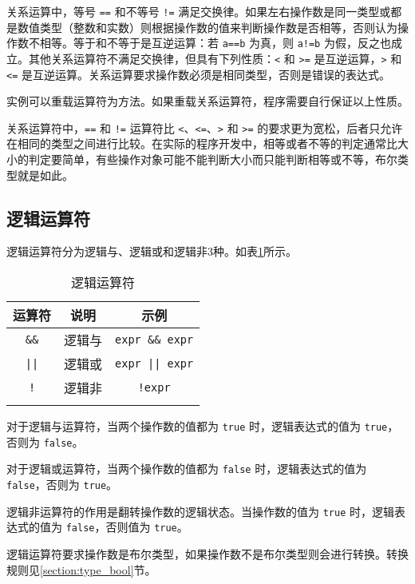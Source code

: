 关系运算中，等号 \texttt{==} 和不等号 \texttt{!=} 满足交换律。如果左右操作数是同一类型或都是数值类型（整数和实数）则根据操作数的值来判断操作数是否相等，否则认为操作数不相等。等于和不等于是互逆运算：若 \texttt{a==b} 为真，则 \texttt{a!=b} 为假，反之也成立。其他关系运算符不满足交换律，但具有下列性质：\texttt{<} 和 \texttt{>=} 是互逆运算，\texttt{>} 和 \texttt{<=} 是互逆运算。关系运算要求操作数必须是相同类型，否则是错误的表达式。

实例可以重载运算符为方法。如果重载关系运算符，程序需要自行保证以上性质。

关系运算符中，\texttt{==} 和 \texttt{!=} 运算符比 \texttt{<}、\texttt{<=}、\texttt{>} 和 \texttt{>=} 的要求更为宽松，后者只允许在相同的类型之间进行比较。在实际的程序开发中，相等或者不等的判定通常比大小的判定要简单，有些操作对象可能不能判断大小而只能判断相等或不等，布尔类型就是如此。

\subsection{逻辑运算符}

逻辑运算符分为逻辑与、逻辑或和逻辑非3种。如表\ref{tab::logic_operator}所示。

\begin{table}[htb]
    \centering
    \setlength{\tabcolsep}{10mm}
    \begin{tabular}{ccc} \Xhline{1pt}
        \textbf{运算符} & \textbf{说明} & \textbf{示例} \\ \hline
        \texttt{\&\&} & 逻辑与 & \texttt{expr \&\& expr} \\
        \texttt{||} & 逻辑或 & \texttt{expr || expr} \\
        \texttt{!} & 逻辑非 & \texttt{!expr} \\
        \Xhline{1pt}
    \end{tabular}
    \caption{逻辑运算符}
    \label{tab::logic_operator}
\end{table}

对于逻辑与运算符，当两个操作数的值都为 \texttt{true} 时，逻辑表达式的值为 \texttt{true}，否则为 \texttt{false}。

对于逻辑或运算符，当两个操作数的值都为 \texttt{false} 时，逻辑表达式的值为 \texttt{false}，否则为 \texttt{true}。

逻辑非运算符的作用是翻转操作数的逻辑状态。当操作数的值为 \texttt{true} 时，逻辑表达式的值为 \texttt{false}，否则值为 \texttt{true}。

逻辑运算符要求操作数是布尔类型，如果操作数不是布尔类型则会进行转换。转换规则见\ref{section:type_bool}节。

